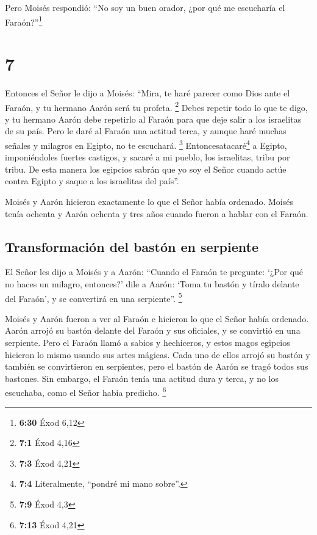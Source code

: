  Pero Moisés respondió: ``No soy un buen orador, ¿por qué
me escucharía el Faraón?''\footnote{\textbf{6:30} Éxod 6,12}

\hypertarget{section-6}{%
\section{7}\label{section-6}}

 Entonces el Señor le dijo a Moisés: ``Mira, te haré
parecer como Dios ante el Faraón, y tu hermano Aarón será tu profeta.
\footnote{\textbf{7:1} Éxod 4,16}  Debes repetir todo lo
que te digo, y tu hermano Aarón debe repetirlo al Faraón para que deje
salir a los israelitas de su país.  Pero le daré al Faraón
una actitud terca, y aunque haré muchas señales y milagros en Egipto, no
te escuchará. \footnote{\textbf{7:3} Éxod 4,21} 
Entoncesatacaré\footnote{\textbf{7:4} Literalmente, ``pondré mi mano
  sobre''.} a Egipto, imponiéndoles fuertes castigos, y sacaré a mi
pueblo, los israelitas, tribu por tribu.  De esta manera
los egipcios sabrán que yo soy el Señor cuando actúe contra Egipto y
saque a los israelitas del país''.

 Moisés y Aarón hicieron exactamente lo que el Señor había
ordenado.  Moisés tenía ochenta y Aarón ochenta y tres
años cuando fueron a hablar con el Faraón.

\hypertarget{transformaciuxf3n-del-bastuxf3n-en-serpiente}{%
\subsection{Transformación del bastón en
serpiente}\label{transformaciuxf3n-del-bastuxf3n-en-serpiente}}

 El Señor les dijo a Moisés y a Aarón: 
``Cuando el Faraón te pregunte: `¿Por qué no haces un milagro,
entonces?' dile a Aarón: `Toma tu bastón y tíralo delante del Faraón', y
se convertirá en una serpiente''. \footnote{\textbf{7:9} Éxod 4,3}

 Moisés y Aarón fueron a ver al Faraón e hicieron lo que
el Señor había ordenado. Aarón arrojó su bastón delante del Faraón y sus
oficiales, y se convirtió en una serpiente.  Pero el
Faraón llamó a sabios y hechiceros, y estos magos egipcios hicieron lo
mismo usando sus artes mágicas.  Cada uno de ellos arrojó
su bastón y también se convirtieron en serpientes, pero el bastón de
Aarón se tragó todos sus bastones.  Sin embargo, el
Faraón tenía una actitud dura y terca, y no los escuchaba, como el Señor
había predicho. \footnote{\textbf{7:13} Éxod 4,21}

